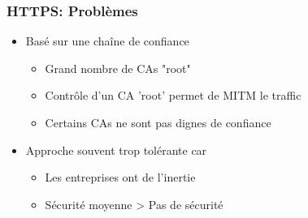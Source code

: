 \begin{frame}
    \frametitle{HTTPS: Problèmes}
    \begin{itemize}
        \item Basé sur une chaîne de confiance
        \begin{itemize}
            \item Grand nombre de CAs "root"
            \item Contrôle d'un CA 'root' permet de MITM le traffic
            \item Certains CAs ne sont pas dignes de confiance
        \end{itemize}
        \item Approche souvent trop tolérante car
        \begin{itemize}
            \item Les entreprises ont de l'inertie
            \item Sécurité moyenne > Pas de sécurité
        \end{itemize}
    \end{itemize}
\end{frame}












